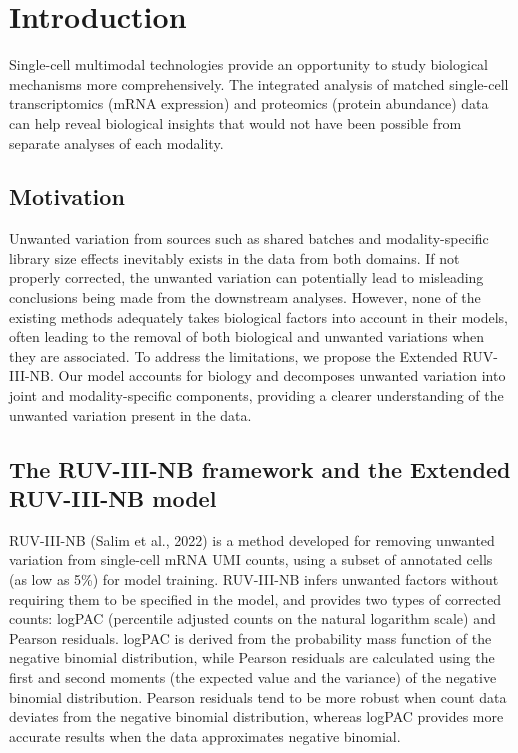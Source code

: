 \documentclass[]{article}
\author{Hsiao-Chi Liao}
\date{2024-10-12}
\begin{document}
\maketitle


{
\setcounter{tocdepth}{2}
\tableofcontents
\newpage
}
\section{Introduction}\label{introduction}

Single-cell multimodal technologies provide an opportunity to study biological mechanisms more comprehensively. The integrated analysis of matched single-cell transcriptomics (mRNA expression) and proteomics (protein abundance) data can help reveal biological insights that would not have been possible from separate analyses of each modality.

\subsection{Motivation}\label{motivation}

Unwanted variation from sources such as shared batches and modality-specific library size effects inevitably exists in the data from both domains. If not properly corrected, the unwanted variation can potentially lead to misleading conclusions being made from the downstream analyses. However, none of the existing methods adequately takes biological factors into account in their models, often leading to the removal of both biological and unwanted variations when they are associated. To address the limitations, we propose the Extended RUV-III-NB. Our model accounts for biology and decomposes unwanted variation into joint and modality-specific components, providing a clearer understanding of the unwanted variation present in the data.

\subsection{The RUV-III-NB framework and the Extended RUV-III-NB model}\label{the-ruv-iii-nb-framework-and-the-extended-ruv-iii-nb-model}

RUV-III-NB (Salim et al., 2022) is a method developed for removing unwanted variation from single-cell mRNA UMI counts, using a subset of annotated cells (as low as 5\%) for model training. RUV-III-NB infers unwanted factors without requiring them to be specified in the model, and provides two types of corrected counts: logPAC (percentile adjusted counts on the natural logarithm scale) and Pearson residuals. logPAC is derived from the probability mass function of the negative binomial distribution, while Pearson residuals are calculated using the first and second moments (the expected value and the variance) of the negative binomial distribution. Pearson residuals tend to be more robust when count data deviates from the negative binomial distribution, whereas logPAC provides more accurate results when the data approximates negative binomial.
\end{document}
